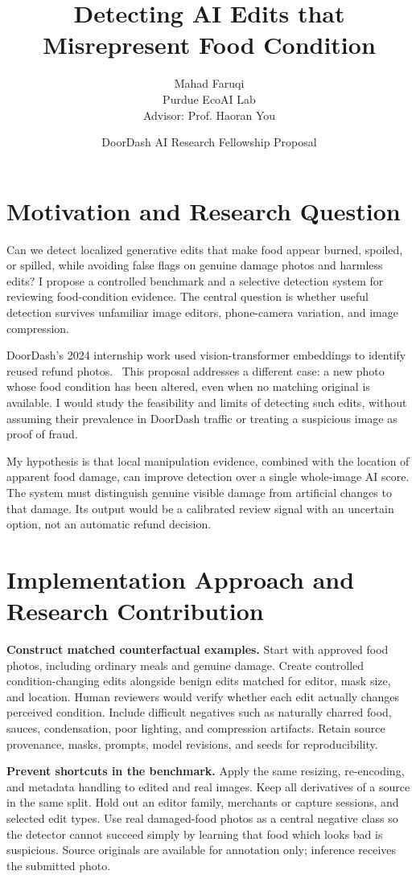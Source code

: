 \documentclass{article}
\title{Detecting AI Edits that Misrepresent Food Condition}
\author{Mahad Faruqi \\
  Purdue EcoAI Lab \\
  Advisor: Prof. Haoran You}
\date{DoorDash AI Research Fellowship Proposal}
\begin{document}
\maketitle

\section{Motivation and Research Question}
Can we detect localized generative edits that make food appear burned, spoiled, or spilled, while avoiding false flags on genuine damage photos and harmless edits? I propose a controlled benchmark and a selective detection system for reviewing food-condition evidence. The central question is whether useful detection survives unfamiliar image editors, phone-camera variation, and image compression.

DoorDash's 2024 internship work used vision-transformer embeddings to identify reused refund photos.~\citep{doordashPhotoReuse2024} This proposal addresses a different case: a new photo whose food condition has been altered, even when no matching original is available. I would study the feasibility and limits of detecting such edits, without assuming their prevalence in DoorDash traffic or treating a suspicious image as proof of fraud.

My hypothesis is that local manipulation evidence, combined with the location of apparent food damage, can improve detection over a single whole-image AI score. The system must distinguish genuine visible damage from artificial changes to that damage. Its output would be a calibrated review signal with an uncertain option, not an automatic refund decision.

\section{Implementation Approach and Research Contribution}
\textbf{Construct matched counterfactual examples.} Start with approved food photos, including ordinary meals and genuine damage. Create controlled condition-changing edits alongside benign edits matched for editor, mask size, and location. Human reviewers would verify whether each edit actually changes perceived condition. Include difficult negatives such as naturally charred food, sauces, condensation, poor lighting, and compression artifacts. Retain source provenance, masks, prompts, model revisions, and seeds for reproducibility.

\textbf{Prevent shortcuts in the benchmark.} Apply the same resizing, re-encoding, and metadata handling to edited and real images. Keep all derivatives of a source in the same split. Hold out an editor family, merchants or capture sessions, and selected edit types. Use real damaged-food photos as a central negative class so the detector cannot succeed simply by learning that food which looks bad is suspicious. Source originals are available for annotation only; inference receives the submitted photo.
\end{document}
